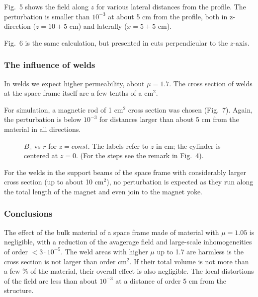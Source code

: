 \documentclass[12pt]{article}
\begin{document}
Fig.\ 5 shows the field along $z$ for various lateral distances from the
profile. The perturbation is smaller than $10^{-3}$
at about 5 cm from the profile, both in z-direction ($z=10+5$ cm) and
laterally ($x=5+5$ cm).

Fig.\ 6 is the same calculation, but presented in cuts perpendicular to
the $z$-axis.

\newpage


\subsubsection*{The influence of welds}

In welds we expect higher permeability, about $\mu=1.7$. The cross
section of welds at the space frame itself are a few tenths of a cm$^2$.

For simulation, a magnetic rod of 1 cm$^2$ cross section was chosen
(Fig.\ 7). Again, the perturbation is below $10^{-3}$ for distances
larger than about 5 cm from the material in all directions.

\begin{figure}[h]
\begin{center}
\parbox{150mm}{
\caption{$B_z$ vs $r$ for $z=const$. The labels refer to $z$ in
cm; the cylinder is centered at $z=0$. (For the steps see the remark in
Fig.\ 4).}
}
\end{center} 
\end{figure}

For the welds in the support beams of the space frame with considerably
larger cross section (up to about 10 cm$^2$), no perturbation is expected
as they run along the total length of the magnet and even join to the
magnet yoke.

 

\subsubsection*{Conclusions}

The effect of the bulk material of a space frame made of material with
$\mu =1.05$ is negligible, with a reduction of the avagerage field and
large-scale inhomogeneities of order $< 3\cdot 10^{-5}$.  The weld areas
with higher $\mu$ up to 1.7 are harmless is the cross section is not
larger than order cm$^2$.  If their total volume is not more than a few
\% of the material, their overall effect is also negligible.  The local
distortions of the field are less than about $10^{-3}$ at a distance of
order 5 cm from the structure.
\end{document}
